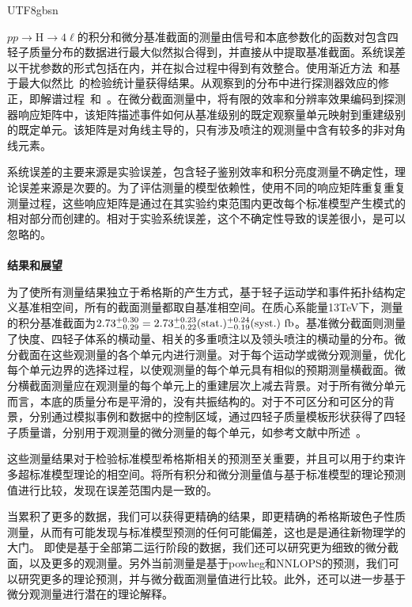\begin{CJK}{UTF8}{gbsn}
\par $pp\to$H$\to4\ell$的积分和微分基准截面的测量由信号和本底参数化的函数对包含四轻子质量分布的数据进行最大似然拟合得到，并直接从中提取基准截面。系统误差以干扰参数的形式包括在内，并在拟合过程中得到有效整合。使用渐近方法~\cite{LHC-HCG}和基于最大似然比~\cite{Cowan:2010js}的检验统计量获得结果。从观察到的分布中进行探测器效应的修正，即解谱过程~\cite{CMSH4lFiducial8TeV}和~\cite{CMSHggFiducial8TeV}。在微分截面测量中，将有限的效率和分辨率效果编码到探测器响应矩阵中，该矩阵描述事件如何从基准级别的既定观察量单元映射到重建级别的既定单元。该矩阵是对角线主导的，只有涉及喷注的观测量中含有较多的非对角线元素。
\par 系统误差的主要来源是实验误差，包含轻子鉴别效率和积分亮度测量不确定性，理论误差来源是次要的。为了评估测量的模型依赖性，使用不同的响应矩阵重复重复测量过程，这些响应矩阵是通过在其实验约束范围内更改每个标准模型产生模式的相对部分而创建的。相对于实验系统误差，这个不确定性导致的误差很小，是可以忽略的。\\ \\
\textbf{\large{结果和展望}} %
\par 	为了使所有测量结果独立于希格斯的产生方式，基于轻子运动学和事件拓扑结构定义基准相空间，所有的截面测量都取自基准相空间。在质心系能量13TeV下，测量的积分基准截面为$2.73^{+0.30}_{-0.29}=2.73^{+0.23}_{-0.22}({\rm stat.})^{+0.24}_{-0.19}({\rm syst.})~{\rm fb}$。基准微分截面则测量了快度、四轻子体系的横动量、相关的多重喷注以及领头喷注的横动量的分布。微分截面在这些观测量的各个单元内进行测量。对于每个运动学或微分观测量，优化每个单元边界的选择过程，以使观测量的每个单元具有相似的预期测量横截面。微分横截面测量应在观测量的每个单元上的重建层次上减去背景。对于所有微分单元而言，本底的质量分布是平滑的，没有共振结构的。对于不可区分和可区分的背景，分别通过模拟事例和数据中的控制区域，通过四轻子质量模板形状获得了四轻子质量谱，分别用于观测量的微分测量的每个单元，如参考文献中所述~\cite{Chatrchyan:2013mxa}。
	\par 这些测量结果对于检验标准模型希格斯相关的预测至关重要，并且可以用于约束许多超标准模型理论的相空间。将所有积分和微分测量值与基于标准模型的理论预测值进行比较，发现在误差范围内是一致的。
	\par 当累积了更多的数据，我们可以获得更精确的结果，即更精确的希格斯玻色子性质测量，从而有可能发现与标准模型预测的任何可能偏差，这也是是通往新物理学的大门。
即使是基于全部第二运行阶段的数据，我们还可以研究更为细致的微分截面，以及更多的观测量。另外当前测量是基于{\sc powheg}和{\sc NNLOPS}的预测，我们可以研究更多的理论预测，并与微分截面测量值进行比较。此外，还可以进一步基于微分观测量进行潜在的理论解释。

\end{CJK}
